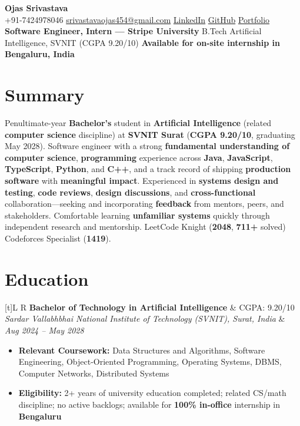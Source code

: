 \documentclass[a4paper,10pt]{article}
\newcommand{\resumeSubheading}[4]{%
  \vspace{0.5mm}
  \noindent
  \begin{tabularx}{\textwidth}[t]{L R}
    \textbf{#1} & #4 \\
    \textit{#3} & \textit{#2} \\
  \end{tabularx}
  \vspace{-0.5mm}%
}
\begin{document}
\selectfont

\begin{center}
  {\LARGE \textbf{Ojas Srivastava}} \\[1mm]
  \small
  +91-7424978046 \textbar{}
  \href{mailto:srivastavaojas454@gmail.com}{srivastavaojas454@gmail.com} \textbar{}
  \href{https://linkedin.com/in/ojas-srivastava05}{LinkedIn} \textbar{}
  \href{https://github.com/Ojas-Srivastava05}{GitHub} \textbar{}
  \href{https://ojas-srivastava.vercel.app}{Portfolio} \\[0.5mm]
  \textbf{Software Engineer, Intern --- Stripe University} \textbar{}
  B.Tech Arti{f}icial Intelligence, SVNIT (CGPA 9.20/10) \textbar{}
  \textbf{Available for on-site internship in Bengaluru, India}
\end{center}

\vspace{-1mm}

\section{Summary}
\small
Penultimate-year \textbf{Bachelor's} student in \textbf{Arti{f}icial Intelligence} (related \textbf{computer science} discipline) at \textbf{SVNIT Surat} (\textbf{CGPA 9.20/10}, graduating May 2028). Software engineer with a strong \textbf{fundamental understanding of computer science}, \textbf{programming} experience across \textbf{Java}, \textbf{JavaScript}, \textbf{TypeScript}, \textbf{Python}, and \textbf{C++}, and a track record of shipping \textbf{production software} with \textbf{meaningful impact}. Experienced in \textbf{systems design and testing}, \textbf{code reviews}, \textbf{design discussions}, and \textbf{cross-functional} collaboration---seeking and incorporating \textbf{feedback} from mentors, peers, and stakeholders. Comfortable learning \textbf{unfamiliar systems} quickly through independent research and mentorship. LeetCode Knight (\textbf{2048}, \textbf{711+} solved) \textbar{} Codeforces Specialist (\textbf{1419}).

\section{Education}
\small
\resumeSubheading
  {Bachelor of Technology in Arti{f}icial Intelligence}{Aug 2024 -- May 2028}
  {Sardar Vallabhbhai National Institute of Technology (SVNIT), Surat, India}{CGPA: 9.20/10}
\begin{itemize}
  \item \textbf{Relevant Coursework:} Data Structures and Algorithms, Software Engineering, Object-Oriented Programming, Operating Systems, DBMS, Computer Networks, Distributed Systems
  \item \textbf{Eligibility:} 2+ years of university education completed; related CS/math discipline; no active backlogs; available for \textbf{100\% in-office} internship in \textbf{Bengaluru}
\end{itemize}
\end{document}
